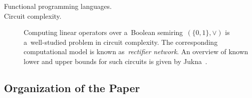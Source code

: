 \documentclass[11pt,letterpaper]{article}
\begin{document}
\begin{description}
\item[Functional programming languages.]

\item[Circuit complexity.] Computing linear operators over
a~Boolean semiring~$(\{0,1\}, \lor)$ is a~well-studied problem 
in circuit complexity. The corresponding computational model is known as~\emph{rectifier network}. An overview of
known lower and upper bounds for such circuits is given by Jukna~\cite[Section~13.6]{DBLP:books/daglib/0028687}.
\end{description}


\subsection{Organization of the Paper}
\end{document}
